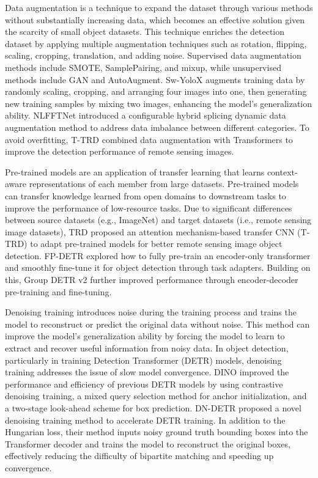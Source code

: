 \documentclass[journal]{IEEEtran}
\begin{document}
Data augmentation is a technique to expand the dataset through various methods without substantially increasing data, which becomes an effective solution given the scarcity of small object datasets. This technique enriches the detection dataset by applying multiple augmentation techniques such as rotation, flipping, scaling, cropping, translation, and adding noise. Supervised data augmentation methods include SMOTE\cite{chawla2002smote}, SamplePairing\cite{inoue2018data}, and mixup\cite{chawla2002smote}, while unsupervised methods include GAN\cite{aggarwal2021generative} and AutoAugment\cite{cubuk2018autoaugment}. Sw-YoloX\cite{ding2023sw} augments training data by randomly scaling, cropping, and arranging four images into one, then generating new training samples by mixing two images, enhancing the model's generalization ability. NLFFTNet\cite{zeng2022nlfftnet} introduced a configurable hybrid splicing dynamic data augmentation method to address data imbalance between different categories. To avoid overfitting, T-TRD  combined data augmentation with Transformers to improve the detection performance of remote sensing images.

Pre-trained models are an application of transfer learning that learns context-aware representations of each member from large datasets. Pre-trained models can transfer knowledge learned from open domains to downstream tasks to improve the performance of low-resource tasks. Due to significant differences between source datasets (e.g., ImageNet) and target datasets (i.e., remote sensing image datasets), TRD proposed an attention mechanism-based transfer CNN (T-TRD) to adapt pre-trained models for better remote sensing image object detection. FP-DETR\cite{wang2021fp} explored how to fully pre-train an encoder-only transformer and smoothly fine-tune it for object detection through task adapters. Building on this, Group DETR v2\cite{chen2022group} further improved performance through encoder-decoder pre-training and fine-tuning.

Denoising training introduces noise during the training process and trains the model to reconstruct or predict the original data without noise. This method can improve the model's generalization ability by forcing the model to learn to extract and recover useful information from noisy data. In object detection, particularly in training Detection Transformer (DETR) models, denoising training addresses the issue of slow model convergence. DINO\cite{zhang2022dino} improved the performance and efficiency of previous DETR models by using contrastive denoising training, a mixed query selection method for anchor initialization, and a two-stage look-ahead scheme for box prediction. DN-DETR\cite{li2022dn} proposed a novel denoising training method to accelerate DETR training. In addition to the Hungarian loss, their method inputs noisy ground truth bounding boxes into the Transformer decoder and trains the model to reconstruct the original boxes, effectively reducing the difficulty of bipartite matching and speeding up convergence.
\end{document}
